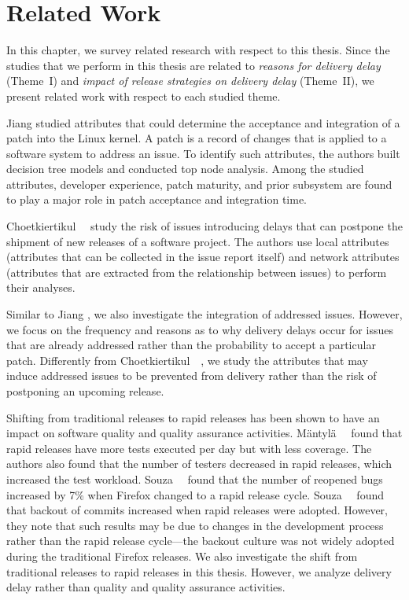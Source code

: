 \chapter[Related Work]{Related Work} \label{chapter7}

In this chapter, we survey related research with respect to this thesis. Since
the studies that we perform in this thesis are related to {\em reasons for
delivery delay} (Theme~I) and {\em impact of release strategies on delivery
delay} (Theme~II), we present related work with respect to each studied theme.

Jiang \etal \cite{Jiang2013} studied attributes that could determine the
acceptance and integration of a patch into the Linux kernel. A patch is a record
of changes that is applied to a software system to address an issue. To identify
such attributes, the authors built decision tree models and conducted top node
analysis. Among the studied attributes, developer experience, patch maturity,
and prior subsystem are found to play a major role in patch acceptance and
integration time. 

Choetkiertikul~\etal~\cite{riskyissues2015a,riskyissues2015b} study the risk of
issues introducing delays that can postpone the shipment of new releases of a
software project. The authors use local attributes (\ie attributes that can be
collected in the issue report itself) and network attributes (\ie attributes
that are extracted from the relationship between issues) to perform their
analyses.

Similar to Jiang \etal\cite{Jiang2013}, we also investigate the integration of
addressed issues. However, we focus on the frequency and reasons as to why
delivery delays occur for issues that are already addressed rather than the
probability to accept a particular patch. Differently from
Choetkiertikul~\etal~\cite{riskyissues2015a,riskyissues2015b}, we study the
attributes that may induce addressed issues to be prevented from delivery rather
than the risk of postponing an upcoming release.

Shifting from traditional releases to rapid releases has been shown to have an
impact on software quality and quality assurance activities.
M\"antyl\"a~\etal~\cite{mantyla2014rapid} found that rapid releases have more
tests executed per day but with less coverage. The authors also found that the
number of testers decreased in rapid releases, which increased the test
workload.  Souza~\etal~\cite{souza2014rapid} found that the number of reopened
bugs increased by 7\% when Firefox changed to a rapid release cycle.
Souza~\etal~\cite{souzabackout} found that backout of commits increased when
rapid releases were adopted.  However, they note that such results may be due to
changes in the development process rather than the rapid release cycle---the
backout culture was not widely adopted during the traditional Firefox releases.
We also investigate the shift from traditional releases to rapid releases in
this thesis. However, we analyze delivery delay rather than quality and quality
assurance activities.

